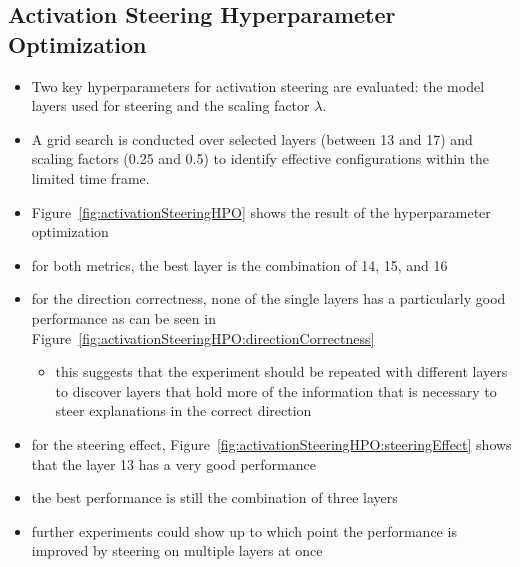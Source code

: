 \subsection{Activation Steering Hyperparameter Optimization}%
\label{sec:evaluation:steering:activationHPO}
\begin{itemize}
  \item Two key hyperparameters for activation steering are evaluated: the model layers used for steering and the scaling factor \(\lambda\).
  \item A grid search is conducted over selected layers (between \num{13} and \num{17}) and scaling factors (\num{0.25} and \num{0.5}) to identify effective configurations within the limited time frame.
  \item Figure~\ref{fig:activationSteeringHPO} shows the result of the hyperparameter optimization
  \item for both metrics, the best layer is the combination of \num{14}, \num{15}, and \num{16}
  \item for the direction correctness, none of the single layers has a particularly good performance as can be seen in Figure~\ref{fig:activationSteeringHPO:directionCorrectness}
        \begin{itemize}
          \item this suggests that the experiment should be repeated with different layers to discover layers that hold more of the information that is necessary to steer explanations in the correct direction
        \end{itemize}
  \item for the steering effect, Figure~\ref{fig:activationSteeringHPO:steeringEffect} shows that the layer \num{13} has a very good performance
  \item the best performance is still the combination of three layers
  \item further experiments could show up to which point the performance is improved by steering on multiple layers at once
\end{itemize}

